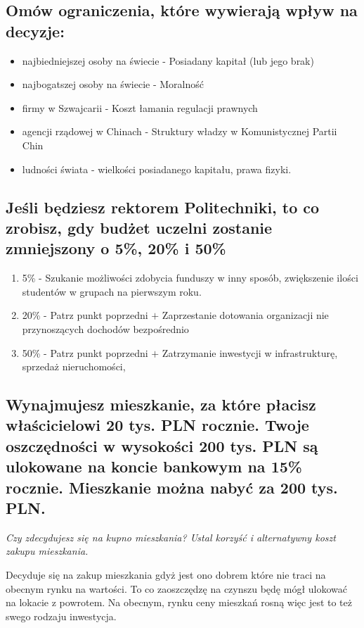 \documentclass[a4paper,12pt]{article}
\begin{document}
\subsection{Omów ograniczenia, które wywierają wpływ na decyzje:}

\begin{itemize}
	\item najbiedniejszej osoby na świecie - Posiadany kapitał (lub jego brak)
	\item najbogatszej osoby na świecie - Moralność
	\item firmy w Szwajcarii - Koszt łamania regulacji prawnych
	\item agencji rządowej w Chinach - Struktury władzy w Komunistycznej Partii Chin
	\item ludności świata - wielkości posiadanego kapitału, prawa fizyki.
\end{itemize}

\subsection{Jeśli będziesz rektorem Politechniki, to co zrobisz, gdy budżet uczelni zostanie zmniejszony o 5\%, 20\% i 50\%}

\begin{enumerate}
	\item 5\% - Szukanie możliwości zdobycia funduszy w inny sposób, zwiększenie ilości studentów w grupach na pierwszym roku.
	\item 20\% - Patrz punkt poprzedni $+$ Zaprzestanie dotowania organizacji nie przynoszących dochodów bezpośrednio
	\item 50\% - Patrz punkt poprzedni $+$ Zatrzymanie inwestycji w infrastrukturę, sprzedaż nieruchomości,  
\end{enumerate}

\subsection{Wynajmujesz mieszkanie, za które płacisz właścicielowi 20 tys. PLN rocznie. Twoje oszczędności w wysokości 200 tys. PLN są ulokowane na koncie ban­kowym na 15\% rocznie. Mieszkanie można nabyć za 200 tys. PLN.}

\emph{Czy zdecydujesz się na kupno mieszkania? Ustal korzyść i alternatywny koszt zakupu mieszkania.}


Decyduje się na zakup mieszkania gdyż jest ono dobrem które nie traci na obecnym rynku na wartości. To co zaoszczędzę na czynszu będę mógł ulokować na lokacie z powrotem. Na obecnym, rynku ceny mieszkań rosną więc jest to też swego rodzaju inwestycja.
\end{document}
